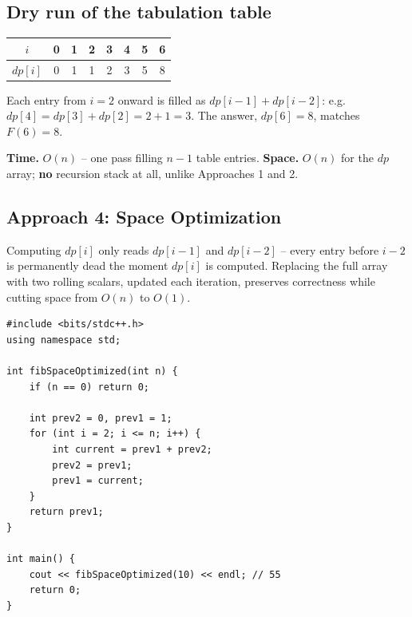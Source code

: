 \subsection*{Dry run of the tabulation table}


\begin{center}
\begin{tabular}{c|c|c|c|c|c|c|c}
$i$ & 0 & 1 & 2 & 3 & 4 & 5 & 6 \\ \hline
$\textit{dp}[i]$ & 0 & 1 & 1 & 2 & 3 & 5 & 8
\end{tabular}
\end{center}

Each entry from $i=2$ onward is filled as $\textit{dp}[i-1]+\textit{dp}[i-2]$:
e.g.\ $\textit{dp}[4] = \textit{dp}[3]+\textit{dp}[2] = 2+1 = 3$. The
answer, $\textit{dp}[6]=8$, matches $F(6)=8$.

\begin{complexitybox}
\textbf{Time.} $O(n)$ -- one pass filling $n-1$ table entries.
\textbf{Space.} $O(n)$ for the $\textit{dp}$ array; \textbf{no}
recursion stack at all, unlike Approaches 1 and 2.
\end{complexitybox}

\subsection*{Approach 4: Space Optimization}

\begin{ideabox}
Computing $\textit{dp}[i]$ only reads $\textit{dp}[i-1]$ and
$\textit{dp}[i-2]$ -- every entry before $i-2$ is permanently dead the
moment $\textit{dp}[i]$ is computed. Replacing the full array with two
rolling scalars, updated each iteration, preserves correctness while
cutting space from $O(n)$ to $O(1)$.
\end{ideabox}

\begin{lstlisting}
#include <bits/stdc++.h>
using namespace std;

int fibSpaceOptimized(int n) {
    if (n == 0) return 0;

    int prev2 = 0, prev1 = 1;
    for (int i = 2; i <= n; i++) {
        int current = prev1 + prev2;
        prev2 = prev1;
        prev1 = current;
    }
    return prev1;
}

int main() {
    cout << fibSpaceOptimized(10) << endl; // 55
    return 0;
}
\end{lstlisting}

